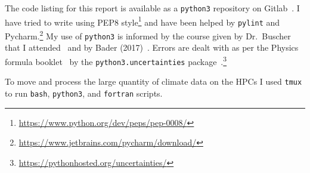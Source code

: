 \documentclass[../main.tex]{subfiles}
\begin{document}
The code listing for this report is available as a \texttt{python3} repository on Gitlab~\cite{gitlab}.
I have tried to write using PEP8 style\footnote{\href{https://www.python.org/dev/peps/pep-0008/}{https://www.python.org/dev/peps/pep-0008/}}
and have been helped by \texttt{pylint} and Pycharm.\footnote{\href{https://www.jetbrains.com/pycharm/download/}{https://www.jetbrains.com/pycharm/download/}}
My use of \texttt{python3} is informed by the course given by Dr.~Buscher that I attended~\cite{SciCompNotes}
and by Bader (2017)~\cite{bader2017python}.
Errors are dealt with as per the Physics formula booklet~\cite{MathsFormulaBooklet}
by the \texttt{python3.uncertainties}
package~\cite{lebigot2010uncertainties}.\footnote{\href{https://pythonhosted.org/uncertainties/}{https://pythonhosted.org/uncertainties/}}

 To move and process the large quantity of climate data on the HPCs I used \texttt{tmux}
 to run \texttt{bash}, \texttt{python3}, and \texttt{fortran} scripts.
\end{document}
